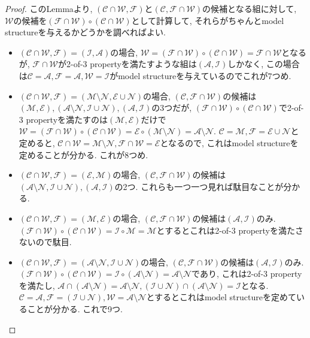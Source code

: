 \documentclass[. /main]{subfiles}
\begin{document}
\begin{proof}
このLemmaより, $(\mathcal{C} \cap \mathcal{W},  \mathcal{F})$と$(\mathcal{C},  \mathcal{F} \cap \mathcal{W})$の候補となる組に対して, $\mathcal{W}$の候補を$(\mathcal{F} \cap \mathcal{W}) \circ (\mathcal{C} \cap \mathcal{W})$として計算して, それらがちゃんとmodel structureを与えるかどうかを調べればよい. 
\begin{itemize}
\item $(\mathcal{C} \cap \mathcal{W},  \mathcal{F})=(\mathcal{I},  \mathcal{A})$の場合, $\mathcal{W}=(\mathcal{F} \cap \mathcal{W}) \circ (\mathcal{C} \cap \mathcal{W})=\mathcal{F} \cap \mathcal{W}$となるが, $\mathcal{F} \cap \mathcal{W}$が2-of-3 propertyを満たすような組は$(\mathcal{A},  \mathcal{I})$しかなく, この場合は$\mathcal{C}=\mathcal{A},  \mathcal{F}=\mathcal{A},  \mathcal{W}=\mathcal{I}$がmodel structureを与えているのでこれが7つめ. 
\item $(\mathcal{C} \cap \mathcal{W},  \mathcal{F})=(\mathcal{M} \setminus \mathcal{N},  \mathcal{E} \cup \mathcal{N})$の場合, $(\mathcal{C},  \mathcal{F} \cap \mathcal{W})$の候補は$(\mathcal{M},  \mathcal{E}),  (\mathcal{A} \setminus \mathcal{N},  \mathcal{I} \cup \mathcal{N}),  (\mathcal{A},  \mathcal{I})$の3つだが, $(\mathcal{F} \cap \mathcal{W}) \circ (\mathcal{C} \cap \mathcal{W})$で2-of-3 propertyを満たすのは$(\mathcal{M},  \mathcal{E})$だけで$\mathcal{W}=(\mathcal{F} \cap \mathcal{W}) \circ (\mathcal{C} \cap \mathcal{W})=\mathcal{E} \circ (\mathcal{M} \setminus \mathcal{N})=\mathcal{A} \setminus \mathcal{N}$. $\mathcal{C}=\mathcal{M},  \mathcal{F}=\mathcal{E} \cup \mathcal{N}$と定めると, $\mathcal{C} \cap \mathcal{W}=\mathcal{M} \setminus \mathcal{N},  \mathcal{F} \cap \mathcal{W}=\mathcal{E}$となるので, これはmodel structureを定めることが分かる. これが8つめ. 
\item $(\mathcal{C} \cap \mathcal{W},  \mathcal{F})=(\mathcal{E},  \mathcal{M})$の場合, $(\mathcal{C},  \mathcal{F} \cap \mathcal{W})$の候補は$(\mathcal{A} \setminus \mathcal{N},  \mathcal{I} \cup \mathcal{N}),  (\mathcal{A},  \mathcal{I})$の2つ. これらも一つ一つ見れば駄目なことが分かる. 
\item $(\mathcal{C} \cap \mathcal{W},  \mathcal{F})=(\mathcal{M},  \mathcal{E})$の場合, $(\mathcal{C},  \mathcal{F} \cap \mathcal{W})$の候補は$(\mathcal{A},  \mathcal{I})$のみ. $(\mathcal{F} \cap \mathcal{W}) \circ (\mathcal{C} \cap \mathcal{W})=\mathcal{I} \circ \mathcal{M}=\mathcal{M}$とするとこれは2-of-3 propertyを満たさないので駄目. 
\item $(\mathcal{C} \cap \mathcal{W},  \mathcal{F})=(\mathcal{A} \setminus \mathcal{N},  \mathcal{I} \cup \mathcal{N})$の場合, $(\mathcal{C},  \mathcal{F} \cap \mathcal{W})$の候補は$(\mathcal{A},  \mathcal{I})$のみ. $(\mathcal{F} \cap \mathcal{W}) \circ (\mathcal{C} \cap \mathcal{W})=\mathcal{I} \circ (\mathcal{A} \setminus \mathcal{N})=\mathcal{A} \setminus \mathcal{N}$であり, これは2-of-3 propertyを満たし, $\mathcal{A} \cap (\mathcal{A} \setminus \mathcal{N})=\mathcal{A} \setminus \mathcal{N},  (\mathcal{I} \cup \mathcal{N}) \cap (\mathcal{A} \setminus \mathcal{N})=\mathcal{I}$となる. $\mathcal{C}=\mathcal{A},  \mathcal{F}=(\mathcal{I} \cup \mathcal{N}),  \mathcal{W}=\mathcal{A} \setminus \mathcal{N}$とするとこれはmodel structureを定めていることが分かる. これで9つ. 

\end{itemize}
\end{proof}
\end{document}
